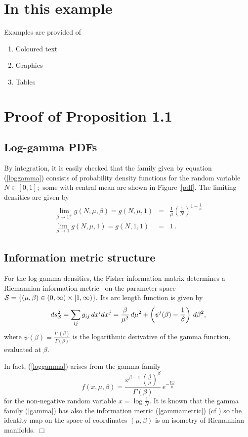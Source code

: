 \documentclass[a4paper,twoside]{article}
\begin{document}
\section{In this example}
Examples are provided of
\begin{enumerate}
\item Coloured text~\pageref{colour}
\item Graphics~\pageref{graphics}
\item Tables~\pageref{table}
\end{enumerate}

\section{Proof of Proposition 1.1}
\subsection{Log-gamma PDFs}
By integration, it is easily checked that the family given by
equation (\ref{loggamma}) consists of probability density
functions for the random variable $N\in [0,1];$ some with central
mean are shown in Figure~\ref{pdf}. The limiting densities are
given by
\begin{eqnarray}
\lim_{\beta\rightarrow 1^+}g(N,\mu,\beta) =
g(N,\mu,1)&=&\frac{1}{\mu}\left(\frac{1}{N}\right)^
      {1 - \frac{1}{\mu }} \\
     \lim_{\mu\rightarrow 1}g(N,\mu,1) = g(N,1,1) &=& 1 \ .
\end{eqnarray}

\subsection{Information metric structure} For the log-gamma
densities, the Fisher information matrix determines a Riemannian
information metric~\cite{amari} on the parameter space ${\cal
S}=\{(\mu,\beta)\in (0,\infty)\times[1,\infty)\}.$ Its arc length
function is given by
\begin{equation}
ds_{\cal{S}}^2=\sum_{ij} g_{ij} \, dx^i dx^j =\frac{\beta}{\mu^2}
\, d\mu^2 +
        \left(\psi'(\beta) -\frac{1}{\beta}\right)\, d\beta^2 , \label{gammametric}
\end{equation}
where $\psi(\beta)=\frac{\Gamma'(\beta)}{\Gamma(\beta)}$ is the
logarithmic derivative of the gamma function, evaluated at
$\beta.$

In fact, (\ref{loggamma}) arises from the gamma family
\begin{equation}
f(x,\mu,\beta) = \frac{ x^{\beta -1} \,
     (\frac{\beta }{\mu})^\beta    }
     {\Gamma(\beta )} \,  e^{-\frac{V\,\beta }{\mu }}
     \label{gamma}
\end{equation}
for the non-negative random variable $x=\log\frac{1}{N}.$ It is
known that the gamma family (\ref{gamma}) has also the information
metric (\ref{gammametric}) (cf \cite{lauritzen}) so the identity
map on the space of coordinates $(\mu,\beta)$ is an isometry of
Riemannian manifolds. \hfill $\Box$
\end{document}

